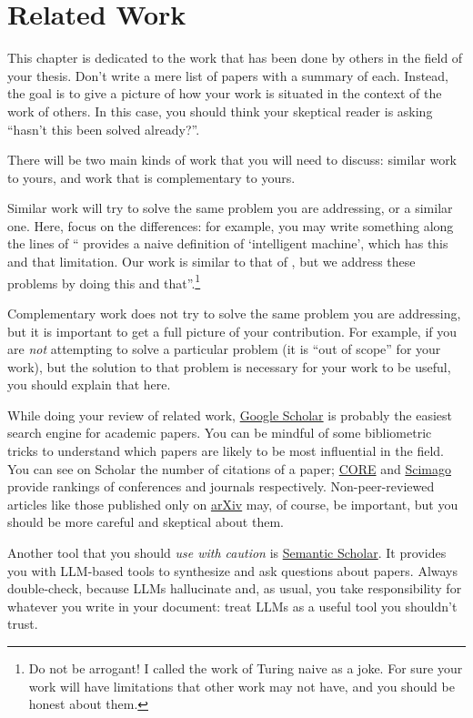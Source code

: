 \chapter{Related Work}
\label{sec:related}

This chapter is dedicated to the work that has been done by others in the field of your thesis.
Don't write a mere list of papers with a summary of each. Instead, the goal is to give a picture
of how your work is situated in the context of the work of others. In this case, you should
think your skeptical reader is asking ``hasn't this been solved already?''.

There will be two main kinds of work that you will need to discuss: similar work
to yours, and work that is complementary to yours.

Similar work will try to solve the same problem you are addressing, or a similar one.
Here, focus on the differences: for example, you may write something along the
lines of ``\textcite{DBLP:journals/x/Turing50} provides a naive definition of
`intelligent machine', which has this and that limitation. Our work is similar to that of
\citeauthor{DBLP:journals/x/Turing50}, but we address these problems by doing this and
that''.\footnote{Do not be arrogant! I called the work of Turing naive as a joke.
For sure your work will have limitations that other work may not have, and you should be honest about them.}

Complementary work does not try to solve the same problem you are addressing, but it is
important to get a full picture of your contribution. For example, if you are
\emph{not} attempting to solve a particular problem (it is ``out of scope'' for your work),
but the solution to that problem is necessary for your work to be useful, you should explain
that here.

While doing your review of related work, \href{https://scholar.google.com}{Google Scholar}
is probably the easiest search engine for academic papers. You can be mindful of some
bibliometric tricks to understand which papers are likely to be most influential in the field.
You can see on Scholar the number of citations of a paper;
\href{https://portal.core.edu.au/conf-ranks/}{CORE} and
\href{https://www.scimagojr.com}{Scimago} provide rankings of conferences and journals
respectively. Non-peer-reviewed articles like those published only on
\href{https://arxiv.org}{arXiv} may, of course, be important, but you should be more careful
and skeptical about them.

Another tool that you should \emph{use with caution} is \href{https://www.semanticscholar.org/}{Semantic Scholar}. It provides you with \ac{LLM}-based tools to synthesize and ask questions about papers. Always double-check, because \acp{LLM} hallucinate and, as usual, you take responsibility for whatever you write in your document: treat \acp{LLM} as a useful tool you shouldn't trust.

